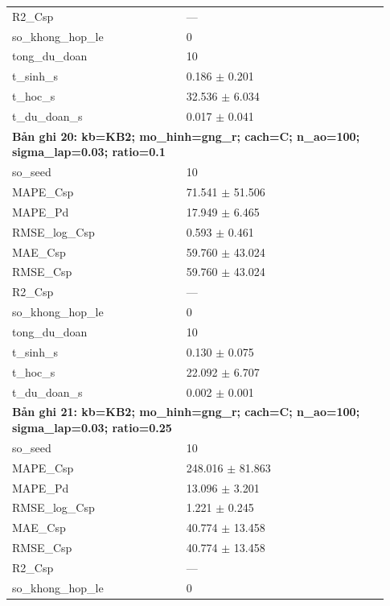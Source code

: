 \begin{longtable}{p{0.43\linewidth}p{0.50\linewidth}}
R2\_\allowbreak Csp & — \\
so\_\allowbreak khong\_\allowbreak hop\_\allowbreak le & 0 \\
tong\_\allowbreak du\_\allowbreak doan & 10 \\
t\_\allowbreak sinh\_\allowbreak s & 0.186 $\pm$ 0.201 \\
t\_\allowbreak hoc\_\allowbreak s & 32.536 $\pm$ 6.034 \\
t\_\allowbreak du\_\allowbreak doan\_\allowbreak s & 0.017 $\pm$ 0.041 \\
\midrule
\multicolumn{2}{p{0.95\linewidth}}{\textbf{Bản ghi 20: kb=KB2; mo\_hinh=gng\_r; cach=C; n\_ao=100; sigma\_lap=0.03; ratio=0.1}} \\
so\_\allowbreak seed & 10 \\
MAPE\_\allowbreak Csp & 71.541 $\pm$ 51.506 \\
MAPE\_\allowbreak Pd & 17.949 $\pm$ 6.465 \\
RMSE\_\allowbreak log\_\allowbreak Csp & 0.593 $\pm$ 0.461 \\
MAE\_\allowbreak Csp & 59.760 $\pm$ 43.024 \\
RMSE\_\allowbreak Csp & 59.760 $\pm$ 43.024 \\
R2\_\allowbreak Csp & — \\
so\_\allowbreak khong\_\allowbreak hop\_\allowbreak le & 0 \\
tong\_\allowbreak du\_\allowbreak doan & 10 \\
t\_\allowbreak sinh\_\allowbreak s & 0.130 $\pm$ 0.075 \\
t\_\allowbreak hoc\_\allowbreak s & 22.092 $\pm$ 6.707 \\
t\_\allowbreak du\_\allowbreak doan\_\allowbreak s & 0.002 $\pm$ 0.001 \\
\midrule
\multicolumn{2}{p{0.95\linewidth}}{\textbf{Bản ghi 21: kb=KB2; mo\_hinh=gng\_r; cach=C; n\_ao=100; sigma\_lap=0.03; ratio=0.25}} \\
so\_\allowbreak seed & 10 \\
MAPE\_\allowbreak Csp & 248.016 $\pm$ 81.863 \\
MAPE\_\allowbreak Pd & 13.096 $\pm$ 3.201 \\
RMSE\_\allowbreak log\_\allowbreak Csp & 1.221 $\pm$ 0.245 \\
MAE\_\allowbreak Csp & 40.774 $\pm$ 13.458 \\
RMSE\_\allowbreak Csp & 40.774 $\pm$ 13.458 \\
R2\_\allowbreak Csp & — \\
so\_\allowbreak khong\_\allowbreak hop\_\allowbreak le & 0 \\

\end{longtable}
